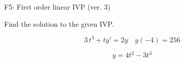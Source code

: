 \begin{exercise}
  \begin{exerciseTitle}F5: First order linear IVP (ver. 3)\end{exerciseTitle}
  \begin{exerciseStatement}
    
Find the solution to the given IVP.

    
\[3 \, t^{3} +ty'= 2 y \hspace{1em} y( -4 ) = 256\]

  \end{exerciseStatement}
  \begin{exerciseAnswer}
    
\[y= 4 t^ 2 -3 t^{3}\]

  \end{exerciseAnswer}
\end{exercise}
